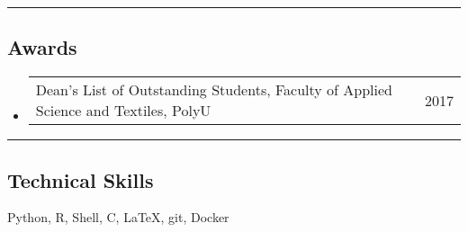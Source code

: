 \documentclass[10pt,letterpaper]{article}
\makeatletter
\newenvironment{indentsection}[1]%
{\begin{list}{}%
	{\setlength{\leftmargin}{#1}}%
	\item[]%
}
{\end{list}}
\newcommand{\headerrow}[2]
{\begin{tabular*}{\linewidth}{l@{\extracolsep{\fill}}r}
	#1 &
	#2 \\
\end{tabular*}}
\newcommand{\CPP}
{C\nolinebreak[4]\hspace{-.05em}\raisebox{.22ex}{\footnotesize\bf ++}}
\makeatother
\begin{document}




	



\hrule
\vspace{-1em}
\subsection*{Awards}

\begin{itemize}
	\parskip=0.1em
		\item
		\headerrow
			{Dean’s List of Outstanding Students, Faculty of Applied Science and Textiles, PolyU}
			{2017}



\end{itemize}



\hrule
\vspace{-1em}
\subsection*{Technical Skills}

\begin{indentsection}{\parindent}
\begin{description*}
	\item {Python, R, Shell, \CPP, \LaTeX, git, Docker}


\end{description*}
\end{indentsection}
\end{document}
